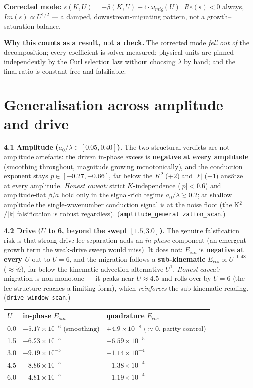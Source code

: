 \documentclass[tc, manuscript]{copernicus}
\begin{document}
\textbf{Corrected mode:} $s(K,U) = -\beta (K,U) + i\cdot \omega _{mig}(U)$, $Re(s)<0$ always, $Im(s)\propto U^{1/2}$ — a damped, downstream-migrating pattern, not a growth–saturation balance.

\textbf{Why this counts as a result, not a check.} The corrected mode \emph{fell out of} the decomposition; every coefficient is solver-measured; physical units are pinned independently by the Curl selection law without choosing $\lambda $ by hand; and the final ratio is constant-free and falsifiable.

\section{Generalisation across amplitude and drive}

\textbf{4.1 Amplitude ($a_{0}/\lambda  \in  [0.05, 0.40]$).} The two structural verdicts are not amplitude artefacts: the driven in-phase excess is \textbf{negative at every amplitude} (smoothing throughout, magnitude growing monotonically), and the conduction exponent stays $p\in [-0.27,+0.66]$, far below the $K^{2}$ ($+2$) and $|k|$ ($+1$) ansätze at every amplitude. \emph{Honest caveat:} strict $K$-independence ($|p|<0.6$) and amplitude-flat $\beta /a$ hold only in the signal-rich regime $a_{0}/\lambda \gtrsim 0.2$; at shallow amplitude the single-wavenumber conduction signal is at the noise floor (the K\ensuremath{^{2}}/|k| falsification is robust regardless). (\texttt{amplitude\_\allowbreak{}generalization\_\allowbreak{}scan}.)

\textbf{4.2 Drive ($U$ to 6, beyond the swept $[1.5,3.0]$).} The genuine falsification risk is that strong-drive lee separation adds an \emph{in-phase} component (an emergent growth term the weak-drive sweep would miss). It does not: $E_{sin}$ is \textbf{negative at every $U$} out to $U=6$, and the migration follows a \textbf{sub-kinematic} $E_{cos} \propto  U^{+0.48}$ (\ensuremath{\approx}½), far below the kinematic-advection alternative $U^{1}$. \emph{Honest caveat:} migration is non-monotone — it peaks near $U\approx 4.5$ and rolls over by $U=6$ (the lee structure reaches a limiting form), which \emph{reinforces} the sub-kinematic reading. (\texttt{drive\_\allowbreak{}window\_\allowbreak{}scan}.)

\begin{center}\small
\begin{tabular}{lll}
\hline
$U$ & in-phase $E_{sin}$ & quadrature $E_{cos}$ \\
\hline
0.0 & $-5.17\times 10^{-6}$ (smoothing) & $+4.9\times 10^{-8}$ (\ensuremath{\approx}0, parity control) \\
1.5 & $-6.23\times 10^{-5}$ & $-6.59\times 10^{-5}$ \\
3.0 & $-9.19\times 10^{-5}$ & $-1.14\times 10^{-4}$ \\
4.5 & $-8.86\times 10^{-5}$ & $-1.38\times 10^{-4}$ \\
6.0 & $-4.81\times 10^{-5}$ & $-1.19\times 10^{-4}$ \\
\hline
\end{tabular}
\end{center}
\end{document}
